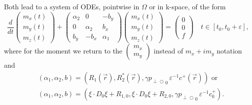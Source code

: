 \documentclass{ws-m3as}
\def\pp{p_{\perp\!\!\!\!\!\bigcirc}}
\def\bb{b}
\newcommand\taup{\varepsilon}
\begin{document}
Both lead to a system of ODEs, pointwise in $\Omega$ or in k-space, of the form
\begin{equation}\label{3by3ODEsys}
\frac{d}{dt}\left(\begin{array}{c}m_x(t)\\m_y(t)\\m_z(t)\end{array}\right)
+
\left(\begin{array}{ccc}
\alpha_2&0&-\bb_y\\ 
0&\alpha_2&\bb_x\\
\bb_y&-\bb_x&\alpha_1\end{array}\right)
\left(\begin{array}{c}m_x(t)\\m_y(t)\\m_z(t)\end{array}\right)
=\left(\begin{array}{c}0\\0\\f\end{array}\right)\quad t\in[t_0,t_0+\taup],
\end{equation}
where for the moment we return to the $\left(\begin{array}{c}m_x\\m_y\end{array}\right)$ instead of $m_x+im_y$ notation and  
\begin{equation}\label{alpha1alpha2b1}
\begin{aligned}
&(\alpha_1,\alpha_2,\bb)=(R_1(\vec r),R_2^*(\vec r),\gamma{\pp}_0\,\taup^{-1} c^+(\vec r))\text{ or }\\
&(\alpha_1,\alpha_2,\bb)=(\xi\cdot D_0\xi +R_{1,0},\xi\cdot D_0\xi +R_{2,0},\gamma{\pp}_0\,\taup^{-1} c^+_0).
\end{aligned}
\end{equation}
\end{document}
